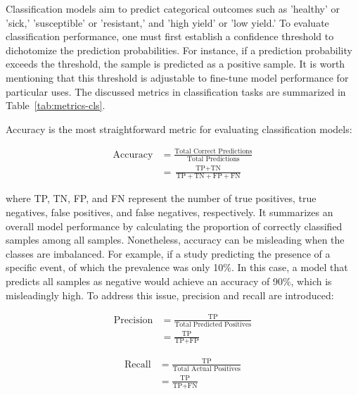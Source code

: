 Classification models aim to predict categorical outcomes such as 'healthy' or 'sick,' 'susceptible' or 'resistant,' and 'high yield' or 'low yield.’ To evaluate classification performance, one must first establish a confidence threshold to dichotomize the prediction probabilities. For instance, if a prediction probability exceeds the threshold, the sample is predicted as a positive sample. It is worth mentioning that this threshold is adjustable to fine-tune model performance for particular uses. The discussed metrics in classification tasks are summarized in Table~\ref{tab:metrics-cls}.

Accuracy is the most straightforward metric for evaluating classification models:

\begin{equation} \label{eq_accuracy}
    \begin{split}
\text{Accuracy} &= \frac{\text{Total Correct Predictions}}{\text{Total Predictions}} \\
        &= \frac{\text{TP} + \text{TN}}{\text{TP} + \text{TN} + \text{FP} + \text{FN}}
    \end{split}
\end{equation}

where TP, TN, FP, and FN represent the number of true positives, true negatives, false positives, and false negatives, respectively. It summarizes an overall model performance by calculating the proportion of correctly classified samples among all samples. Nonetheless, accuracy can be misleading when the classes are imbalanced. For example, if a study predicting the presence of a specific event, of which the prevalence was only 10\%. In this case, a model that predicts all samples as negative would achieve an accuracy of 90\%, which is misleadingly high. To address this issue, precision and recall are introduced:

\begin{equation} \label{eq_precision}
    \begin{split}
    \text{Precision} &= \frac{\text{TP}}{\text{Total Predicted Positives}}\\
                    &=\frac{\text{TP}}{\text{TP} + \text{FP}}
    \end{split}
\end{equation}

\begin{equation} \label{eq_recall}
    \begin{split}
    \text{Recall} &= \frac{\text{TP}}{\text{Total Actual Positives}}\\
                &=\frac{\text{TP}}{\text{TP} + \text{FN}}
    \end{split}
\end{equation}

